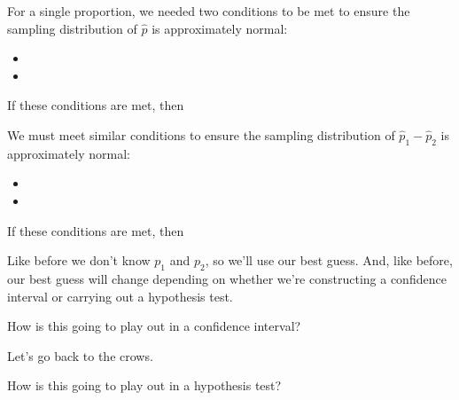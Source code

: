\documentclass[
  letterpaper,
  DIV=11,
  numbers=noendperiod]{scrartcl}
\providecommand{\tightlist}{%
  \setlength{\itemsep}{0pt}\setlength{\parskip}{0pt}}\usepackage{longtable,booktabs,array}
\begin{document}
For a single proportion, we needed two conditions to be met to ensure
the sampling distribution of \(\hat{p}\) is approximately normal:

\begin{itemize}
\tightlist
\item
  \hfill\break
\item
  \hfill\break
  \hfill\break
  \hfill\break
\end{itemize}

If these conditions are met, then

\hfill\break
\hfill\break
\hfill\break
\hfill\break
\hfill\break
\hfill\break
\hfill\break
\hfill\break
\hfill\break
\hfill\break
\hfill\break

We must meet similar conditions to ensure the sampling distribution of
\(\hat p_1 - \hat p_2\) is approximately normal:

\begin{itemize}
\item
  \hfill\break
  \hfill\break
\item
  \hfill\break
  \hfill\break
  \hfill\break
\end{itemize}

If these conditions are met, then

\hfill\break
\hfill\break
\hfill\break
\hfill\break
\hfill\break
\hfill\break
\hfill\break
\hfill\break

Like before we don't know \(p_1\) and \(p_2\), so we'll use our best
guess. And, like before, our best guess will change depending on whether
we're constructing a confidence interval or carrying out a hypothesis
test.

\newpage

How is this going to play out in a confidence interval?

\hfill\break
\hfill\break
\hfill\break
\hfill\break
\hfill\break
\hfill\break
\hfill\break
\hfill\break
\hfill\break
\hfill\break
\hfill\break
\hfill\break
\hfill\break
\hfill\break
\hfill\break
\hfill\break
\hfill\break

Let's go back to the crows.

\hfill\break
\hfill\break
\hfill\break
\hfill\break
\hfill\break
\hfill\break
\hfill\break
\hfill\break
\hfill\break
\hfill\break
\hfill\break
\hfill\break
\hfill\break
\hfill\break

\newpage

How is this going to play out in a hypothesis test?

\hfill\break
\hfill\break
\hfill\break
\hfill\break
\hfill\break
\hfill\break
\hfill\break
\hfill\break
\hfill\break
\hfill\break
\hfill\break
\hfill\break
\hfill\break
\hfill\break
\hfill\break
\hfill\break
\hfill\break
\hfill\break
\hfill\break
\hfill\break
\end{document}
